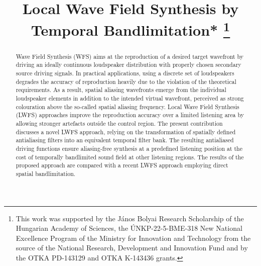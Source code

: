 \documentclass[conference]{IEEEtran}
\begin{document}
\title{Local Wave Field Synthesis by Temporal Bandlimitation*
\thanks{This work was supported by the János Bolyai Research Scholarship of the Hungarian Academy of Sciences, the ÚNKP-22-5-BME-318 New National Excellence Program of the Ministry for Innovation and Technology from the source of the National Research, Development and Innovation Fund
and by the OTKA PD-143129 and OTKA K-143436 grants.
}
}

\author{
\and
{}
\and
{}
\and
{}
}

\maketitle

\begin{abstract}
    Wave Field Synthesis (WFS) aims at the reproduction of a desired target wavefront by driving an ideally continuous loudspeaker distribution with properly chosen secondary source driving signals.
    In practical applications, using a discrete set of loudspeakers degrades the accuracy of reproduction heavily due to the violation of the theoretical requirements.
    As a result, spatial aliasing wavefronts emerge from the individual loudspeaker elements in addition to the intended virtual wavefront, perceived as strong colouration above the so-called spatial aliasing frequency.
    Local Wave Field Synthesis (LWFS) approaches improve the reproduction accuracy over a limited listening area by allowing stronger artefacts outside the control region.
    The present contribution discusses a novel LWFS approach, relying on the transformation of spatially defined antialiasing filters into an equivalent temporal filter bank.
    The resulting antialiased driving functions ensure aliasing-free synthesis at a predefined listening position at the cost of temporally bandlimited sound field at other listening regions.
    The results of the proposed approach are compared with a recent LWFS approach employing direct spatial bandlimitation.
\end{abstract}
\end{document}
